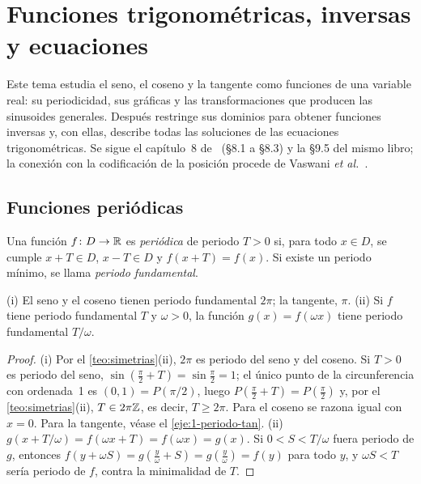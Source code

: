 \chapter{Funciones trigonométricas, inversas y ecuaciones}
\label{tema:4}

Este tema estudia el seno, el coseno y la tangente como funciones de una variable real: su periodicidad, sus gráficas y las transformaciones que producen las sinusoides generales. Después restringe sus dominios para obtener funciones inversas y, con ellas, describe todas las soluciones de las ecuaciones trigonométricas. Se sigue el capítulo~8 de~\cite{osat} (§8.1 a §8.3) y la §9.5 del mismo libro; la conexión con la codificación de la posición procede de Vaswani \emph{et al.}~\cite[§3.5]{vaswani}.

\section{Funciones periódicas}

\begin{definicion}
Una función $f\colon D\to\mathbb{R}$ es \emph{periódica} de periodo $T>0$ si, para todo $x\in D$, se cumple $x+T\in D$, $x-T\in D$ y $f(x+T)=f(x)$. Si existe un periodo mínimo, se llama \emph{periodo fundamental}.
\end{definicion}

\begin{proposicion}\label{prop:periodos}
(i) El seno y el coseno tienen periodo fundamental $2\pi$; la tangente, $\pi$. (ii) Si $f$ tiene periodo fundamental $T$ y $\omega>0$, la función $g(x)=f(\omega x)$ tiene periodo fundamental $T/\omega$.
\end{proposicion}

\begin{proof}
(i) Por el \cref{teo:simetrias}(ii), $2\pi$ es periodo del seno y del coseno. Si $T>0$ es periodo del seno, $\sin(\frac{\pi}{2}+T)=\sin\frac{\pi}{2}=1$; el único punto de la circunferencia con ordenada~1 es $(0,1)=P(\pi/2)$, luego $P(\frac{\pi}{2}+T)=P(\frac{\pi}{2})$ y, por el \cref{teo:simetrias}(ii), $T\in2\pi\mathbb{Z}$, es decir, $T\ge2\pi$. Para el coseno se razona igual con $x=0$. Para la tangente, véase el \cref{eje:1-periodo-tan}. (ii) $g(x+T/\omega)=f(\omega x+T)=f(\omega x)=g(x)$. Si $0<S<T/\omega$ fuera periodo de $g$, entonces $f(y+\omega S)=g(\frac{y}{\omega}+S)=g(\frac{y}{\omega})=f(y)$ para todo $y$, y $\omega S<T$ sería periodo de $f$, contra la minimalidad de $T$.
\end{proof}

